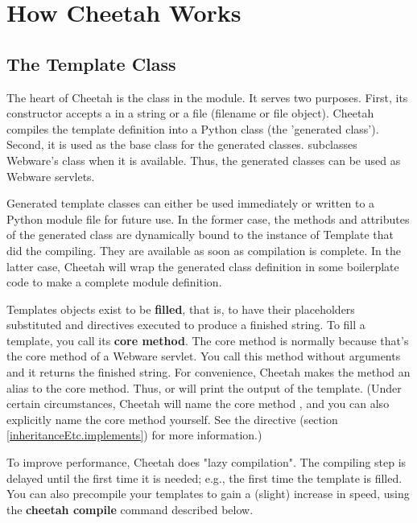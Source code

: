 \section{How Cheetah Works}
\label{howWorks}

\subsection{The Template Class}
\label{howWorks.templateClass}

The heart of Cheetah is the  class in the 
module. It serves two purposes. First, its constructor accepts a
 in a string or a file (filename or file object).
Cheetah compiles the template definition into a Python class (the 'generated
class'). Second, it is used as the base class for the generated classes.
 subclasses Webware's  class when it is
available. Thus, the generated classes can be used as Webware servlets.

Generated template classes can either be used immediately or written to a Python
module file for future use. In the former case, the methods and attributes of
the generated class are dynamically bound to the instance of Template that did
the compiling. They are available as soon as compilation is complete. In the
latter case, Cheetah will wrap the generated class definition in some
boilerplate code to make a complete module definition.

Templates objects exist to be {\bf filled}, that is, to have their 
placeholders substituted and directives executed to produce a finished string.
To fill a template, you call its {\bf core method}.  The core method is
normally  because that's the core method of a Webware
servlet.  You call this method without arguments and it returns the
finished string.  For convenience, Cheetah makes the
 method an alias to the core method. Thus,  or  will print the
output of the template.  (Under certain circumstances, Cheetah will name the
core method , and you can also explicitly name the core
method yourself.  See the  directive (section
\ref{inheritanceEtc.implements}) for more information.)

To improve performance, Cheetah does "lazy compilation".  The compiling step is
delayed until the first time it is needed; e.g., the first time the template is
filled.  You can also precompile your templates to gain a (slight) increase
in speed, using the {\bf cheetah compile} command described below.

